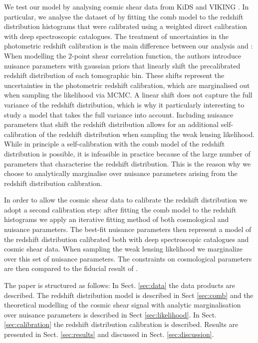 \documentclass{aa}
\begin{document}
We test our model by analysing cosmic shear data from KiDS and VIKING \citep[VISTA Kilo-Degree Infrared Galaxy Survey;][]{2013Msngr.154...32E}. In particular, we analyse the dataset of \cite{hildebrandt18} by fitting the comb model to the redshift distribution histograms that were calibrated using a weighted direct calibration with deep spectroscopic catalogues.
The treatment of uncertainties in the photometric redshift calibration is the main difference between our analysis and \cite{hildebrandt18}: When modelling the 2-point shear correlation function, the authors introduce nuisance parameters with gaussian priors that linearly shift the precalibrated redshift distribution of each tomographic bin. These shifts represent the uncertainties in the photometric redshift calibration, which are marginalised out when sampling the likelihood via MCMC. A linear shift does not capture the full variance of the redshift distribution, which is why it particularly interesting to study a model that takes the full variance into account. Including nuisance parameters that shift the redshift distribution allows for an additional self-calibration of the redshift distribution when sampling the weak lensing likelihood. While in principle a self-calibration with the comb model of the redshift distribution is possible, it is infeasible in practice because of the large number of parameters that characterise the redshift distribution. This is the reason why we choose to analytically marginalise over nuisance parameters arising from the redshift distribution calibration. 

In order to allow the cosmic shear data to calibrate the redshift distribution we adopt a second calibration step: after fitting the comb model to the redshift histograms we apply an iterative fitting method of both cosmological and nuisance parameters. The best-fit nuisance parameters then represent a model of the redshift distribution calibrated both with deep spectroscopic catalogues and cosmic shear data. When sampling the weak lensing likelihood we marginalize over this set of nuisance parameters. The constraints on cosmological parameters are then compared to the fiducial result of \cite{hildebrandt18}.
 
The paper is structured as follows: In Sect. \ref{sec:data} the data products are described. The redshift distribution model is described in Sect \ref{sec:comb} and the theoretical modelling of the cosmic shear signal with analytic marginalisation over nuisance parameters is described in Sect \ref{sec:likelihood}. In Sect. \ref{sec:calibration} the redshift distribution calibration is described. Results are presented in Sect. \ref{sec:results} and discussed in Sect. \ref{sec:discussion}.
 
\end{document}
